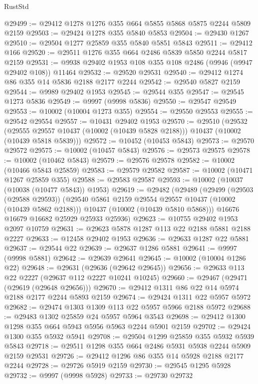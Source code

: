 \begin{lexlean}{RustStd}
\begin{coremodule}
@29499 := @29412 @1278 @1276 @355 @664 @5855 @5868 @5875 @2244 @5809 @2159
@29503 := @29424 @1278 @355 @5840 @5853
@29504 := @29430 @1267
@29510 := @29504 @1277 @25859 @355 @5840 @5851 @5843
@29511 := @29412 @166
@29520 := @29511 @1276 @355 @664 @2486 @5839 @5850 @2244 @5817 @2159
@29531 := @9938 @29402 @1953 @108 @355 @108 @2486 (@9946 (@9947 @29402 @108)) @11464
@29532 := @29520 @29531
@29540 := @29412 @1274 @86 @355 @14 @5836 @2188 @2177 @2244
@29542 := @29540 @5827 @2159
@29544 := @9989 @29402 @1953
@29545 := @29544 @355
@29547 := @29545 @1273 @5836
@29549 := @9997 (@9998 @5836)
@29550 := @29547 @29549
@29553 := @10002 (@10004 @1273 @355)
@29554 := @29550 @29553
@29555 := @29542 @29554
@29557 := @10431 @29402 @1953
@29570 := @29510
    (@29532
      (@29555 @29557 @10437 (@10002 (@10439 @5828 @2188)))
      @10437
      (@10002 (@10439 @5818 @5839)))
@29572 := @10452 (@10453 @5843)
@29573 := @29570 @29572
@29575 := @10002 (@10457 @5843)
@29576 := @29573 @29575
@29578 := @10002 (@10462 @5843)
@29579 := @29576 @29578
@29582 := @10002 (@10466 @5843 @25859)
@29583 := @29579 @29582
@29587 := @10002 (@10471 @1267 @25859 @355)
@29588 := @29583 @29587
@29593 := @10002 (@10037 (@10038 (@10477 @5843)) @1953)
@29619 := @29482
    (@29489
      (@29499
        (@29503 (@29588 @29593))
        (@29540 @5861 @2159 @29554 @29557 @10437 (@10002 (@10439 @5862 @2188)))
        @10437
        (@10002 (@10439 @5810 @5868)))
      @16676
      @16679
      @16682
      @25929
      @25933
      @25936)
@29623 := @10755 @29402 @1953 @2097 @10759
@29631 := @29623 @5878 @1287 @113 @22 @2188 @5881 @2188 @2227
@29633 := @12458 @29402 @1953
@29636 := @29633 @1287 @22 @5881
@29637 := @29544 @22
@29639 := @29637 @1286 @5881
@29641 := @9997 (@9998 @5881)
@29642 := @29639 @29641
@29645 := @10002 (@10004 @1286 @22)
@29648 := @29631 (@29636 (@29642 @29645))
@29656 := @29633 @113 @22 @2227 (@29637 @112 @2227 @10241 @10245)
@29660 := @29467 (@29471 (@29619 (@29648 @29656)))
@29670 := @29412 @1311 @86 @22 @14 @5974 @2188 @2177 @2244 @5893 @2159
@29674 := @29424 @1311 @22 @5957 @5972
@29682 := @29474 @1303 @1309 @113 @22 @5957 @5966 @2188 @5972
@29688 := @29483 @1302 @25859 @24 @5957 @5964 @3543
@29698 := @29412 @1300 @1298 @355 @664 @5943 @5956 @5963 @2244 @5901 @2159
@29702 := @29424 @1300 @355 @5932 @5941
@29708 := @29504 @1299 @25859 @355 @5932 @5939 @5843
@29718 := @29511 @1298 @355 @664 @2486 @5931 @5938 @2244 @5909 @2159 @29531
@29726 := @29412 @1296 @86 @355 @14 @5928 @2188 @2177 @2244
@29728 := @29726 @5919 @2159
@29730 := @29545 @1295 @5928
@29732 := @9997 (@9998 @5928)
@29733 := @29730 @29732

\end{coremodule}
\end{lexlean}
